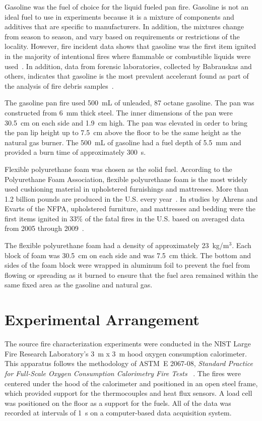 \documentclass[twoside]{uocthesis}
\begin{document}
{Gasoline was the fuel of choice for the liquid fueled pan fire.  Gasoline is not an ideal fuel to use in experiments because it is a mixture of components and additives that are specific to manufacturers. In addition, the mixtures change from season to season, and vary based on requirements or restrictions of the locality.  However, fire incident data shows that gasoline was the first item ignited in the majority of intentional fires where flammable or combustible liquids were used~\cite{Rohr:2001}. In addition, data from forensic laboratories, collected by Babrauskas and others, indicates that gasoline is the most prevalent accelerant found as part of the analysis of fire debris samples~\cite{Babrauskas:2003,Chasteen:2010}.

The gasoline pan fire used 500~mL of unleaded, 87 octane gasoline.  The pan was constructed from 6~mm thick steel.  The inner dimensions of the pan were 30.5~cm on each side and 1.9~cm high.  The pan was elevated in order to bring the pan lip height up to 7.5~cm above the floor to be the same height as the natural gas burner.  The 500~mL of gasoline had a fuel depth of 5.5~mm and provided a burn time of approximately 300~s.

Flexible polyurethane foam was chosen as the solid fuel. According to the Polyurethane Foam Association, flexible polyurethane foam is the most widely used cushioning material in upholstered furnishings and mattresses. More than 1.2 billion pounds are produced in the U.S. every year~\cite{Foam,Polyurethane_Foam}. In studies by Ahrens and Evarts of the NFPA, upholstered furniture, and mattresses and bedding were the first items ignited in 33\% of the fatal fires in the U.S. based on averaged data from 2005 through 2009~\cite{Ahrens:2011,Evarts:2011}.

The flexible polyurethane foam had a density of approximately 23~kg/m$^3$.  Each block of foam was 30.5~cm on each side and was 7.5~cm thick. The bottom and sides of the foam block were wrapped in aluminum foil to prevent the fuel from flowing or spreading as it burned to ensure that the fuel area remained within the same fixed area as the gasoline and natural gas.

\section{Experimental Arrangement}

The source fire characterization experiments were conducted in the NIST Large Fire Research Laboratory's 3~m x 3~m hood oxygen consumption calorimeter. This apparatus follows the methodology of ASTM~E 2067-08, {\em Standard Practice for Full-Scale Oxygen Consumption Calorimetry Fire Tests} ~\cite{ASTM_E2067}. The fires were centered under the hood of the calorimeter and positioned in an open steel frame, which provided support for the thermocouples and heat flux sensors. A load cell was positioned on the floor as a support for the fuels.  All of the data was recorded at intervals of 1~s on a computer-based data acquisition system.

}
\end{document}
